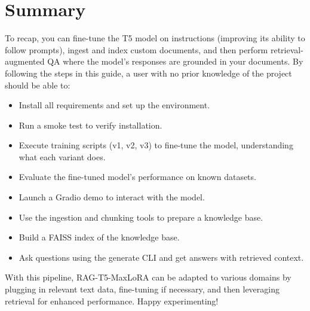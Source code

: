 \documentclass{article}
\begin{document}
\section*{Summary}
To recap, you can fine-tune the T5 model on instructions (improving its ability to follow prompts), ingest and index custom documents, and then perform retrieval-augmented QA where the model’s responses are grounded in your documents. By following the steps in this guide, a user with no prior knowledge of the project should be able to:
\begin{itemize}
    \item Install all requirements and set up the environment.
    \item Run a smoke test to verify installation.
    \item Execute training scripts (v1, v2, v3) to fine-tune the model, understanding what each variant does.
    \item Evaluate the fine-tuned model’s performance on known datasets.
    \item Launch a Gradio demo to interact with the model.
    \item Use the ingestion and chunking tools to prepare a knowledge base.
    \item Build a FAISS index of the knowledge base.
    \item Ask questions using the generate CLI and get answers with retrieved context.
\end{itemize}

With this pipeline, RAG-T5-MaxLoRA can be adapted to various domains by plugging in relevant text data, fine-tuning if necessary, and then leveraging retrieval for enhanced performance. Happy experimenting!
\end{document}

